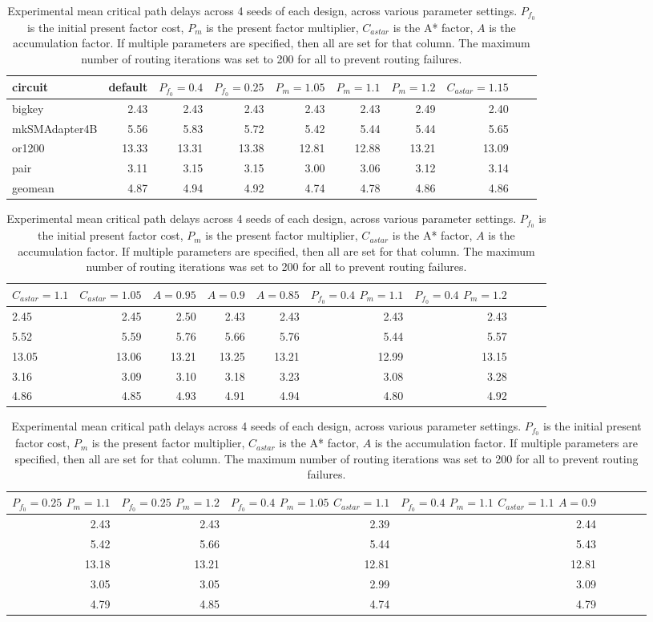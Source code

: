 \documentclass[11pt]{article}
\begin{document}
\begin{table}[h]\centering
\begin{tabular}{l | *{9}r}
\hline\hline
circuit & \scriptsize  default & \scriptsize  $P_{f_0} = 0.4$ & \scriptsize  $P_{f_0} = 0.25$  & \scriptsize   $P_m = 1.05$ & \scriptsize   $P_m = 1.1$ & \scriptsize   $P_m = 1.2$ & \scriptsize  $C_{astar} = 1.15$ \\
\hline
bigkey & 2.43 & 2.43 & 2.43 & 2.43 & 2.43 & 2.49 & 2.40 \\
mkSMAdapter4B & 5.56 & 5.83 & 5.72 & 5.42 & 5.44 & 5.44 & 5.65 \\
or1200 & 13.33 & 13.31 & 13.38 & 12.81 & 12.88 & 13.21 & 13.09 \\
pair & 3.11 & 3.15 & 3.15 & 3.00 & 3.06 & 3.12 & 3.14 \\
\hline
geomean & 4.87 & 4.94 & 4.92 & 4.74 & 4.78 & 4.86 & 4.86 \\
\end{tabular}
\begin{tabular}{l *{9}r}
\hline\hline
\scriptsize  $C_{astar} = 1.1$ & \scriptsize  $C_{astar} = 1.05$ & \scriptsize  $A = 0.95$ & \scriptsize  $A = 0.9$ & \scriptsize  $A = 0.85$ & \scriptsize  $P_{f_0} = 0.4$   $P_m = 1.1$ & \scriptsize  $P_{f_0} = 0.4$   $P_m = 1.2$ \\
\hline
2.45 & 2.45 & 2.50 & 2.43 & 2.43 & 2.43 & 2.43 \\
5.52 & 5.59 & 5.76 & 5.66 & 5.76 & 5.44 & 5.57 \\
13.05 & 13.06 & 13.21 & 13.25 & 13.21 & 12.99 & 13.15 \\
3.16 & 3.09 & 3.10 & 3.18 & 3.23 & 3.08 & 3.28 \\
\hline
4.86 & 4.85 & 4.93 & 4.91 & 4.94 & 4.80 & 4.92 \\
\end{tabular}
\begin{tabular}{*{8}r}
\hline\hline
\scriptsize  $P_{f_0} = 0.25$   $P_m = 1.1$ & \scriptsize  $P_{f_0} = 0.25$   $P_m = 1.2$ & \scriptsize  $P_{f_0} = 0.4$   $P_m = 1.05$ $C_{astar} = 1.1$ & \scriptsize  $P_{f_0} = 0.4$   $P_m = 1.1$ $C_{astar} = 1.1$ $A = 0.9$ \\
\hline
2.43 & 2.43 & 2.39 & 2.44 \\
5.42 & 5.66 & 5.44 & 5.43 \\
13.18 & 13.21 & 12.81 & 12.81 \\
3.05 & 3.05 & 2.99 & 3.09 \\
\hline
4.79 & 4.85 & 4.74 & 4.79 \\
\end{tabular}
\caption{Experimental mean critical path delays across 4 seeds of each design, across various parameter settings. $P_{f_0}$ is the initial present factor cost, $P_m$ is the present factor multiplier, $C_{astar}$ is the A* factor, $A$ is the accumulation factor. If multiple parameters are specified, then all are set for that column. The maximum number of routing iterations was set to 200 for all to prevent routing failures.}
\label{tab:param-data}
\end{table}
\end{document}
